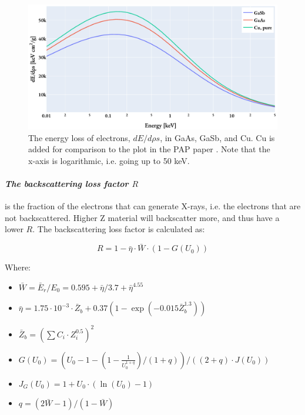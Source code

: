 \begin{figure}[htbp]
    \centering
    \includegraphics[width=0.8\linewidth]{figures/PAP_energy_loss_dE_drhos.pdf}
    \caption{
        The energy loss of electrons, $dE/d\rho s$,  in GaAs, GaSb, and Cu.
        Cu is added for comparison to the plot in the PAP paper \cite[Fig. 4]{pap_1991}.
        Note that the x-axis is logarithmic, i.e. going up to 50 keV.
    }
    \label{fig:PAP:energy_loss_electrons_dE_drhos}
\end{figure}





\paragraph*{\emph{The backscattering loss factor $R$}} is the fraction of the electrons that can generate X-rays, i.e. the electrons that are not backscattered.
Higher Z material will backscatter more, and thus have a lower $R$.
The backscattering loss factor is calculated as:

\begin{equation}
    \label{eq:theory:quantitative:pap:calculation_of_F:R}
    R = 1 - \bar{\eta}  \cdot \bar{W} \cdot (1-G(U_0))
\end{equation}

Where:

\begin{itemize}
    \item  $\bar{W} = \bar{E}_r/E_0 = 0.595 + \bar{\eta}/3.7 + \bar{\eta}^{4.55} $
    \item  $\bar{\eta} = 1.75 \cdot 10^{-3} \cdot \bar{Z}_b + 0.37(1-\exp(-0.015\bar{Z}_b^{1.3})) $
    \item  $\bar{Z}_b = (\sum C_i \cdot Z_i^{0.5})^2$
    \item  $G(U_0) = (U_0 - 1 - (1- \frac{1}{U_0^{1+q}})/(1+q)) / ((2+q)\cdot J(U_0))$
    \item  $J_G(U_0) = 1 + U_0 \cdot (\ln(U_0)-1) $
    \item  $q = (2 \bar{W} - 1) / (1 - \bar{W}) $
\end{itemize}


